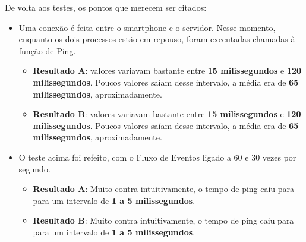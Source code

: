 \documentclass[a4paper,12pt]{article}
\begin{document}
De volta aos testes, os pontos que merecem ser citados:

\begin{itemize}

    \item Uma conexão é feita entre o smartphone e o servidor. Nesse momento, enquanto os dois processos estão em repouso, foram executadas chamadas à função de Ping.

    \begin{itemize}
        \item \textbf{Resultado A}: valores variavam bastante entre \textbf{15 milissegundos} e \textbf{120 milissegundos}. Poucos valores saíam desse intervalo, a média era de \textbf{65 milissegundos}, aproximadamente.
        \item \textbf{Resultado B}: valores variavam bastante entre \textbf{15 milissegundos} e \textbf{120 milissegundos}. Poucos valores saíam desse intervalo, a média era de \textbf{65 milissegundos}, aproximadamente.
    \end{itemize}

    \item O teste acima foi refeito, com o Fluxo de Eventos ligado a 60 e 30 vezes por segundo.

    \begin{itemize}
        \item \textbf{Resultado A}: Muito contra intuitivamente, o tempo de ping caiu para para um intervalo de \textbf{1 a 5 milissegundos}.
        \item \textbf{Resultado B}: Muito contra intuitivamente, o tempo de ping caiu para para um intervalo de \textbf{1 a 5 milissegundos}.
    \end{itemize}


\end{itemize}









%
%
\end{document}
